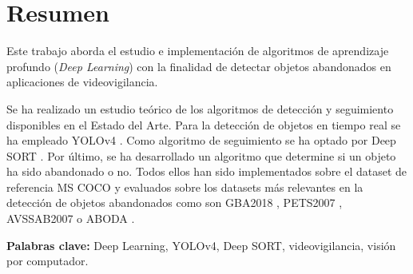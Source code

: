 
\chapter*{Resumen}
\label{cha:resumen}


Este trabajo aborda el estudio e implementación de algoritmos de aprendizaje profundo (\textit{Deep Learning}) con la finalidad de detectar objetos abandonados en aplicaciones de videovigilancia.

Se ha realizado un estudio teórico de los algoritmos de detección y seguimiento disponibles en el Estado del Arte. Para la detección de objetos en tiempo real se ha empleado YOLOv4 \cite{bochkovskiy2020yolov4}. Como algoritmo de seguimiento se ha optado por Deep SORT \cite{Wojke2017simple}. Por último, se ha desarrollado un algoritmo que determine si un objeto ha sido abandonado o no. Todos ellos han sido implementados sobre el dataset de referencia MS COCO \cite{lin2015microsoft} y evaluados sobre los datasets más relevantes en la detección de objetos abandonados como son GBA2018 \cite{gba-dataset}, PETS2007 \cite{pets2007-dataset}, AVSSAB2007 \cite{AVSSAB2007-dataset} o ABODA \cite{aboda-dataset}.

\textbf{Palabras clave:} Deep Learning, YOLOv4, Deep SORT, videovigilancia, visión por computador.